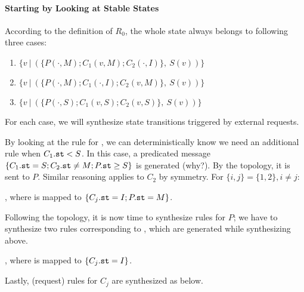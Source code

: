 \documentclass[format=manuscript]{acmart}
\begin{document}
\paragraph{Starting by Looking at Stable States}

According to the definition of $R_0$, the whole state always belongs to
following three cases:

\begin{enumerate}
\item $\{ v\ |\ (\{ P(\cdot, M); C_1(v, M); C_2(\cdot, I) \},\ S(v)) \}$
\item $\{ v\ |\ (\{ P(\cdot, M); C_1(\cdot, I); C_2(v, M) \},\ S(v)) \}$
\item $\{ v\ |\ (\{ P(\cdot, S); C_1(v, S); C_2(v, S) \},\ S(v)) \}$
\end{enumerate}

For each case, we will synthesize state transitions triggered by external
requests.


\iffalse %

\begin{center}
\end{center}

By looking at the rule for , we can deterministically know we need
an additional rule when $C_1.\texttt{st} < S$. In this case, a predicated message $\{
C_1.\texttt{st} = S; C_2.\texttt{st} \neq M; P.\texttt{st} \geq S \}$ is generated (why?). By
the topology, it is sent to $P$. Similar reasoning applies to $C_2$ by symmetry.
For $\{i, j\} = \{1, 2\}, i \neq j$:

\begin{center}
  , where
   is mapped to $\{ C_j.\texttt{st} = I; P.\texttt{st} = M \}$.
\end{center}

Following the topology, it is now time to synthesize rules for $P$; we have to
synthesize two rules corresponding to , which are generated
while synthesizing  above.

\begin{center}
  , where
   is mapped to $\{ C_j.\texttt{st} = I \}$.
\end{center}

Lastly, (request) rules for $C_j$ are synthesized as below.
\end{document}
